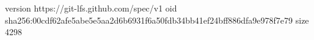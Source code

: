 version https://git-lfs.github.com/spec/v1
oid sha256:00cdf62afe5abe5e5aa2d6b6931f6a50fdb34bb41ef24bff886dfa9e978f7e79
size 4298
